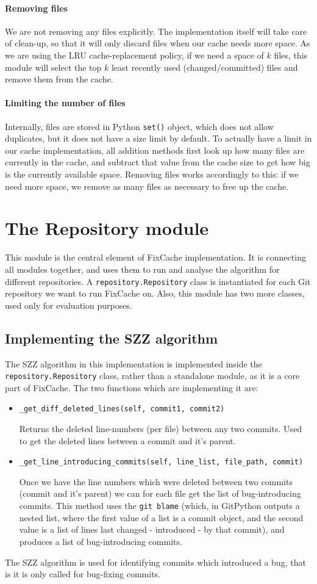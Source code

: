 \documentclass[12pt,twoside,notitlepage]{report}
\newcommand{\fxch}{FixCache}
\begin{document}
\paragraph{Removing files} We are not removing any files explicitly. The implementation itself will take care of clean-up, so that it will only discard files when our cache needs more space. As we are using the LRU cache-replacement policy, if we need a space of $k$ files, this module will select the top $k$ least recently used (changed/committed) files and remove them from the cache.

\paragraph{Limiting the number of files}
Internally, files are stored in Python \texttt{set()} object, which does not allow duplicates, but it does not have a size limit by default. To actually have a limit in our cache implementation, all addition methods first look up how many files are currently in the cache, and subtract that value from the cache size to get how big is the currently available space. Removing files works accordingly to this: if we need more space, we remove as many files as necessary to free up the cache.
\clearpage
\section{The Repository module}
This module is the central element of \fxch{} implementation. It is connecting all modules together, and uses them to run and analyse the algorithm for different repositories. A \texttt{repository.Repository} class is instantiated for each Git repository we want to run \fxch{} on. Also, this module has two more classes, used only for evaluation purposes.
\subsection{Implementing the SZZ algorithm}
The SZZ algorithm in this implementation is implemented inside the \texttt{repository.Repository} class, rather than a standalone module, as it is a core part of \fxch{}.
The two functions which are implementing it are:
\begin{itemize}
\item \texttt{\_get\_diff\_deleted\_lines(self, commit1, commit2)}

Returns the deleted line-numbers (per file) between any two commits. Used to get the deleted lines between a commit and it's parent.
\item \texttt{\_get\_line\_introducing\_commits(self, line\_list, file\_path, commit)}

Once we have the line numbers which were deleted between two commits (commit and it's parent) we can for each file get the list of bug-introducing commits. This method uses the \texttt{git blame} (which, in GitPython outputs a nested list, where the first value of a list is a commit object, and the second value is a list of lines last changed - introduced - by that commit), and produces a list of bug-introducing commits.
\end{itemize}
The SZZ algorithm is used for identifying commits which introduced a bug, that is it is only called for bug-fixing commits.
\end{document}
